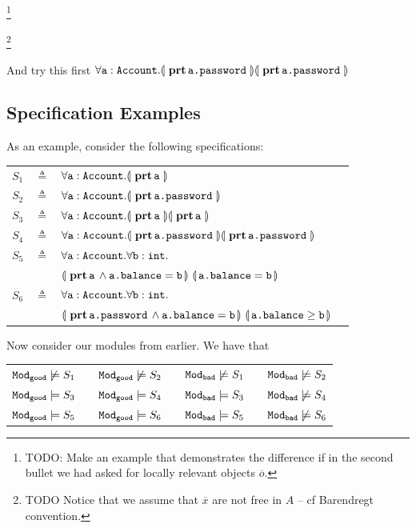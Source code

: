  
  \footnote{{TODO: Make an example that demonstrates the difference if in the second bullet we had asked for locally relevant objects ${\overline o}$.}}
 
\footnote{{TODO Notice that we assume that $\overline x$ are not free in $A$ -- cf Barendregt convention.}}




And try this first $\TwoStatesQ {\prg{a}:\prg{Account}}  {\inside{\prg{a.password}}} {\inside{\prg{a.password}}}$

\subsection{Specification Examples}
\noindent
As an example, consider the following    specifications:

\begin{tabular}{lcll}
$S_1$   &     $\triangleq$   & $\OneStateQ{\prg{a}:\prg{Account} } {\inside{\prg{a}}} $
 \\
 $S_2$   &     $\triangleq$   & $\OneStateQ{\prg{a}:\prg{Account} } {\inside{\prg{a.password}}} $
 \\
 $S_3$   & $\triangleq$   &  $\TwoStatesQ {\prg{a}:\prg{Account}}  {\inside{\prg{a}}} {\inside{\prg{a}}} $
 \\
 $S_4$   & $\triangleq$   &  $\TwoStatesQ {\prg{a}:\prg{Account}}  {\inside{\prg{a.password}}} {\inside{\prg{a.password}}}$
 \\
$S_5$ & $\triangleq$   &
 $\forall \prg{a}:\prg{Account}.\forall \prg{b}:\prg{int}.$\\
  &  &  $\FirstState{\inside{\prg{a}} \wedge \prg{a.balance}=\prg{b}} 
\  \SecondState{ \prg{a.balance}= \prg{b} }$
\\
$S_6$ & $\triangleq$   &
  $\forall \prg{a}:\prg{Account}.\forall \prg{b}:\prg{int}.$\\
  &  &  $\FirstState{\inside{\prg{a.password}} \wedge \prg{a.balance}=\prg{b}} 
\  \SecondState{ \prg{a.balance}\geq \prg{b} }$
 \end{tabular}

\vspace{.2cm}
Now consider our modules from earlier. We have that

\begin{tabular}{lllllll}
$\ModA \not\models S_1$  & & $\ModA \not\models S_2$ &&  $\ModB \not\models S_1$ &  &$\ModB \not\models S_2$ \\
$\ModA \models S_3$ & &   $\ModA \models S_4$ & &  $\ModB  \models S_3$ & &  $\ModB  \not\models S_4$ \\
$\ModA \models S_5$ & &  $\ModA \models S_6$ & & $\ModB  \models S_5$ & & $\ModB   \not\models S_6$ \\
\end{tabular}


